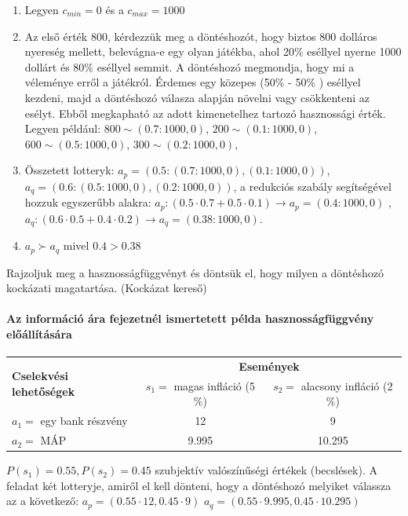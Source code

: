 \documentclass[a4paper,12pt]{article}
\begin{document}
\begin{enumerate}
\item Legyen $c_{min} = 0$ és a $c_{max} = 1000$
\item Az első érték 800, kérdezzük meg a döntéshozót, hogy biztos 800 dolláros nyereség mellett, belevágna-e egy olyan játékba, ahol 20$\%$ eséllyel nyerne 1000 dollárt és 80$\%$  eséllyel semmit. A döntéshozó megmondja, hogy mi a véleménye erről a játékról. Érdemes egy közepes (50$\%$ - 50$\%$ ) eséllyel kezdeni, majd a döntéshozó válasza alapján növelni vagy csökkenteni az esélyt. Ebből megkapható az adott kimenetelhez tartozó hasznossági érték. Legyen például: $800 \sim (0.7:1000, 0)$, $200 \sim (0.1:1000, 0)$, $600 \sim (0.5:1000, 0)$, $300 \sim (0.2:1000, 0)$,
  
\item Összetett lotteryk:  $a_p = (0.5:(0.7:1000, 0), (0.1:1000, 0))$, $a_q = (0.6:(0.5:1000, 0), (0.2:1000, 0))$, a redukciós szabály segítségével hozzuk egyszerűbb alakra: $a_p : (0.5\cdot 0.7+0.5\cdot 0.1) \rightarrow a_p=(0.4:1000, 0)$ , $a_q : (0.6\cdot 0.5+0.4\cdot 0.2) \rightarrow a_q = (0.38:1000, 0)$.
\item $a_p \succ a_q$ mivel $0.4 > 0.38$
\end{enumerate}

Rajzoljuk meg a hasznosságfüggvényt és döntsük el, hogy milyen a döntéshozó kockázati magatartása. (Kockázat kereső)

\paragraph{Az információ ára fejezetnél ismertetett példa hasznosságfüggvény előállítására}

\begin{center}
\begin{tabular}{l|c|c}
\multirow{2}{*}{\bf Cselekvési lehetőségek } &  \multicolumn{2}{c}{ \bf Események }\\
 & $s_1=$ magas infláció (5$\%$) & $s_2=$ alacsony infláció (2$\%$) \\
\hline
  $a_1=$ egy bank részvény & 12 & 9 \\
  $a_2=$ MÁP & 9.995 & 10.295 \\
\end{tabular}
\end{center}
$P(s_1) = 0.55 , P(s_2) = 0.45$ szubjektív valószínűségi értékek (becslések).
A feladat két lotteryje, amiről el kell dönteni, hogy a döntéshozó melyiket válassza az a következő:
$a_p = ( 0.55 \cdot 12 , 0.45 \cdot 9 ) $
$a_q = ( 0.55 \cdot 9.995 , 0.45 \cdot 10.295 ) $
\end{document}
